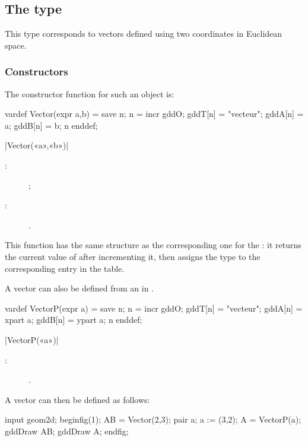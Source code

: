 \documentclass[a4paper,english]{article}
\begin{document}
\subsection{The  type}

This type corresponds to vectors defined using two coordinates in Euclidean space.

\subsubsection{Constructors}

The constructor function for such an object is:
%
\begin{mpcode}
vardef Vector(expr a,b) =
  save n; n = incr gddO;
  gddT[n] = "vecteur"; gddA[n] = a; gddB[n] = b; n
enddef;
\end{mpcode}

\begin{colourband}
\macro|Vector(«a»,«b»)|
\begin{description}
  \item[:]  ;
  \item[:] .
\end{description}
\end{colourband}
\bigskip

This function has the same structure as the corresponding one for the : it returns the current value of  after incrementing it, then assigns the type  to the corresponding entry in the  table.

A vector can also be defined from an  in \MP.
\begin{mpcode}
vardef VectorP(expr a) =
  save n; n = incr gddO;
  gddT[n] = "vecteur"; gddA[n] = xpart a; gddB[n] = ypart a; n
enddef;
\end{mpcode}

\begin{colourband}
\macro|VectorP(«a»)|
\begin{description}
  \item[:] .
\end{description}
\end{colourband}
\bigskip

A vector can then be defined as follows:
\begin{ExempleMP}
input geom2d;
beginfig(1);
AB = Vector(2,3);
pair a;
a := (3,2);
A = VectorP(a);
gddDraw AB;
gddDraw A;
endfig;
\end{ExempleMP}
\end{document}
